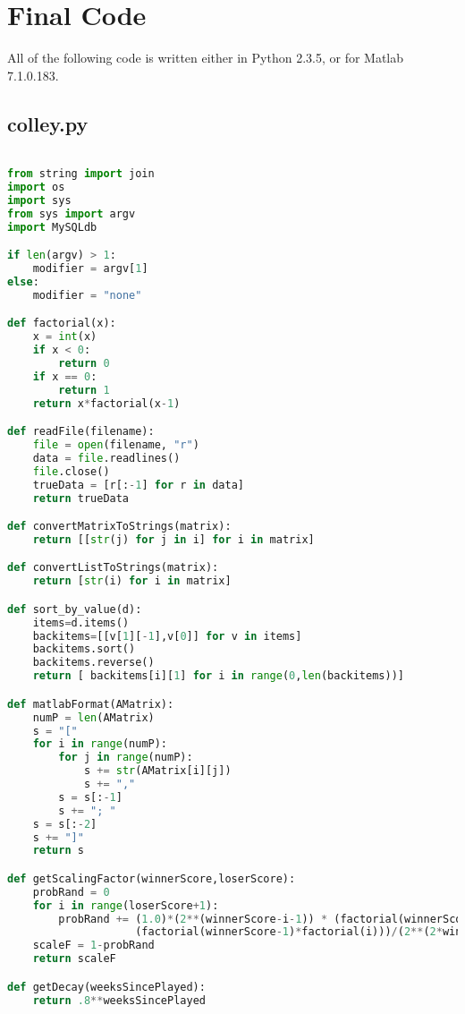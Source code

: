 \documentclass[12pt, letterpaper]{article}
\begin{document}
\newpage

\appendix

\section{Final Code}

\par All of the following code is written either in Python 2.3.5, or for Matlab 7.1.0.183.

\subsection{colley.py}

\begin{lstlisting}[language=python]

from string import join
import os
import sys
from sys import argv
import MySQLdb

if len(argv) > 1:
    modifier = argv[1]
else:
    modifier = "none"

def factorial(x):
    x = int(x)
    if x < 0:
        return 0
    if x == 0:
        return 1
    return x*factorial(x-1)

def readFile(filename):
    file = open(filename, "r")
    data = file.readlines()
    file.close()
    trueData = [r[:-1] for r in data]
    return trueData

def convertMatrixToStrings(matrix):
    return [[str(j) for j in i] for i in matrix]

def convertListToStrings(matrix):
    return [str(i) for i in matrix]

def sort_by_value(d):
    items=d.items()
    backitems=[[v[1][-1],v[0]] for v in items]
    backitems.sort()
    backitems.reverse()
    return [ backitems[i][1] for i in range(0,len(backitems))]

def matlabFormat(AMatrix):
    numP = len(AMatrix)
    s = "["
    for i in range(numP):
        for j in range(numP):
            s += str(AMatrix[i][j])
            s += ","
        s = s[:-1]
        s += "; "
    s = s[:-2]
    s += "]"
    return s

def getScalingFactor(winnerScore,loserScore):
    probRand = 0
    for i in range(loserScore+1):
        probRand += (1.0)*(2**(winnerScore-i-1)) * (factorial(winnerScore+i-1)/
                    (factorial(winnerScore-1)*factorial(i)))/(2**(2*winnerScore-1))
    scaleF = 1-probRand
    return scaleF

def getDecay(weeksSincePlayed):
    return .8**weeksSincePlayed


\end{lstlisting}
\end{document}
